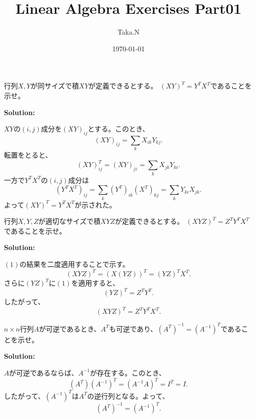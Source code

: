 \documentclass[uplatex,dvipdfmx]{jlreq}		%
\title{Linear Algebra Exercises Part01}
\author{Taka.N}
\date{\today}
\newenvironment{solution}{
  \par\noindent\textbf{Solution:} \itshape
}{\vspace{10pt}}
\begin{document}
\maketitle


\begin{problem}[Prob1.1]
行列$X, Y$が同サイズで積$XY$が定義できるとする。  
$(XY)^T = Y^T X^T$であることを示せ。
\end{problem}

\begin{solution}  
$XY$の$(i,j)$成分を$(XY)_{ij}$とする。このとき、  
\[
(XY)_{ij} = \sum_{k} X_{ik} Y_{kj}.
\]  
転置をとると、  
\[
(XY)^T_{ij} = (XY)_{ji} = \sum_k X_{jk} Y_{ki}.
\]
一方で$Y^T X^T$の$(i,j)$成分は  
\[
(Y^T X^T)_{ij} = \sum_k (Y^T)_{ik} (X^T)_{kj} = \sum_k Y_{ki} X_{jk}.
\]
よって$(XY)^T = Y^T X^T$が示された。
\end{solution}

\begin{problem}[Prob1.2]
行列$X, Y, Z$が適切なサイズで積$XYZ$が定義できるとする。  
$(XYZ)^T = Z^T Y^T X^T$であることを示せ。
\end{problem}

\begin{solution}
$(1)$の結果を二度適用することで示す。  
\[
(XYZ)^T = (X(YZ))^T = (YZ)^T X^T.
\]
さらに$(YZ)^T$に$(1)$を適用すると、  
\[
(YZ)^T = Z^T Y^T.
\]
したがって、  
\[
(XYZ)^T = Z^T Y^T X^T.
\]
\end{solution}

\begin{problem}[Prob1.3]
$n \times n$行列$A$が可逆であるとき、$A^T$も可逆であり、$(A^T)^{-1} = (A^{-1})^T$であることを示せ。
\end{problem}

\begin{solution}
$A$が可逆であるならば、$A^{-1}$が存在する。このとき、  
\[
(A^T)(A^{-1})^T = (A^{-1}A)^T = I^T = I.
\]
したがって、$(A^{-1})^T$は$A^T$の逆行列となる。よって、  
\[
(A^T)^{-1} = (A^{-1})^T.
\]
\end{solution}
\end{document}

